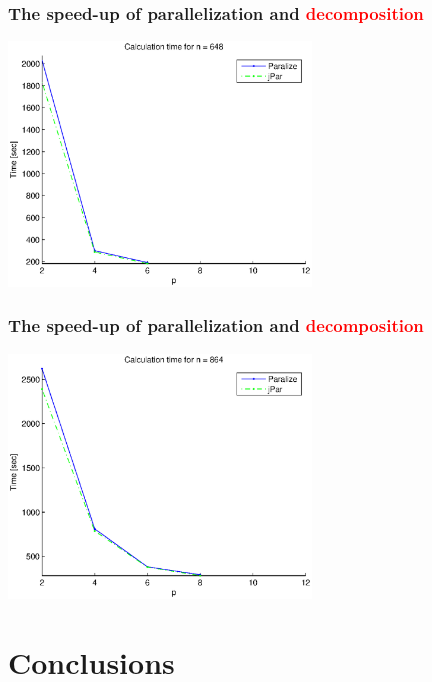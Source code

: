 \documentclass{beamer}
\begin{document}
\begin{frame}
\frametitle{The speed-up of parallelization and \textcolor{red}{decomposition}}
\centering
\includegraphics[height=6.5cm]{fig4}
\end{frame}
\begin{frame}
\frametitle{The speed-up of parallelization and \textcolor{red}{decomposition}}
\centering
\includegraphics[height=6.5cm]{fig5}
\end{frame}

\section{Conclusions}
\end{document}
